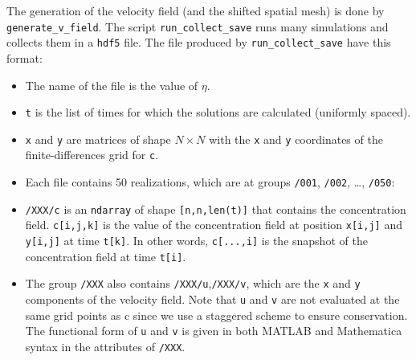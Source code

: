 \documentclass{article}
\newcommand{\0}{^{(0)}}
\begin{document}
The generation of the velocity field (and the shifted spatial mesh) is done by \verb|generate_v_field|. The script \verb|run_collect_save| runs many simulations and collects them in a \verb|hdf5| file. 
The file produced by \texttt{run\_collect\_save} have this format: 

\begin{itemize}
	\item The name of the file is the value of $\eta$.
	\item \verb|t| is the list of times for which the solutions are calculated	(uniformly spaced).
	\item \verb|x| and \verb|y| are matrices of shape $N\times N$ with the \texttt{x} and \texttt{y} coordinates of the	finite-differences grid for \verb|c|.
	\item Each file contains 50 realizations, which are at groups \texttt{/001},
	\texttt{/002}, \ldots{}, \texttt{/050}: 
	\item \texttt{/XXX/c} is an
	\texttt{ndarray} of shape \texttt{{[}n,n,len(t){]}} that contains the
	concentration field. \texttt{c{[}i,j,k{]}} is the value of the
	concentration field at position \texttt{x{[}i,j{]}} and
	\texttt{y{[}i,j{]}} at time \texttt{t{[}k{]}}. In other words,
	\texttt{c{[}...,i{]}} is the snapshot of the concentration field at time
	\texttt{t{[}i{]}}. 
	\item The group \texttt{/XXX} also contains
	\texttt{/XXX/u},\texttt{/XXX/v}, which are the \texttt{x} and \texttt{y}
	components of the velocity field. Note that \texttt{u} and \texttt{v}
	are not evaluated at the same grid points as c since we use a staggered
	scheme to ensure conservation. The functional form of \texttt{u} and
	\texttt{v} is given in both MATLAB and Mathematica syntax in the
	attributes of \texttt{/XXX}.
\end{itemize} 
\end{document}

